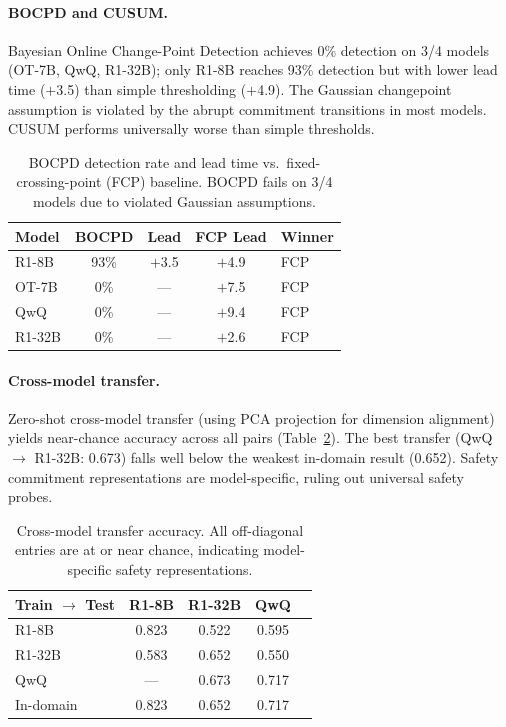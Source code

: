 \documentclass[11pt,a4paper]{article}
\begin{document}
\paragraph{BOCPD and CUSUM.}
Bayesian Online Change-Point Detection \cite{adams2007bocpd} achieves 0\% detection on 3/4 models (OT-7B, QwQ, R1-32B); only R1-8B reaches 93\% detection but with lower lead time ($+$3.5) than simple thresholding ($+$4.9).
The Gaussian changepoint assumption is violated by the abrupt commitment transitions in most models.
CUSUM performs universally worse than simple thresholds.

\begin{table}[t]
\centering
\small
\begin{tabular}{lcccl}
\toprule
\textbf{Model} & \textbf{BOCPD} & \textbf{Lead} & \textbf{FCP Lead} & \textbf{Winner} \\
\midrule
R1-8B & 93\% & $+$3.5 & $+$4.9 & FCP \\
OT-7B & 0\% & --- & $+$7.5 & FCP \\
QwQ & 0\% & --- & $+$9.4 & FCP \\
R1-32B & 0\% & --- & $+$2.6 & FCP \\
\bottomrule
\end{tabular}
\caption{BOCPD detection rate and lead time vs.\ fixed-crossing-point (FCP) baseline. BOCPD fails on 3/4 models due to violated Gaussian assumptions.}
\label{tab:bocpd}
\end{table}

\paragraph{Cross-model transfer.}
Zero-shot cross-model transfer (using PCA projection for dimension alignment) yields near-chance accuracy across all pairs (Table~\ref{tab:transfer}).
The best transfer (QwQ $\to$ R1-32B: 0.673) falls well below the weakest in-domain result (0.652).
Safety commitment representations are model-specific, ruling out universal safety probes.

\begin{table}[t]
\centering
\small
\begin{tabular}{lcccc}
\toprule
\textbf{Train $\to$ Test} & \textbf{R1-8B} & \textbf{R1-32B} & \textbf{QwQ} \\
\midrule
R1-8B & 0.823 & 0.522 & 0.595 \\
R1-32B & 0.583 & 0.652 & 0.550 \\
QwQ & --- & 0.673 & 0.717 \\
\midrule
In-domain & 0.823 & 0.652 & 0.717 \\
\bottomrule
\end{tabular}
\caption{Cross-model transfer accuracy. All off-diagonal entries are at or near chance, indicating model-specific safety representations.}
\label{tab:transfer}
\end{table}
\end{document}

